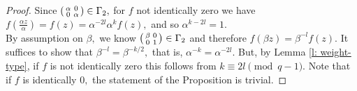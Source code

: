 \documentclass[11pt]{amsart}
\theoremstyle{definition}
\newenvironment{psmallmatrix}
{\left(\begin{smallmatrix}}
	{\end{smallmatrix}\right)}
\numberwithin{equation}{section}
\newcommand{\bbF}{\mathbb{F}}		%
\newcommand{\Mod}[1]{\ (\mathrm{mod}\ #1)}
\begin{document}
\begin{proof}
Since $\displaystyle{\begin{psmallmatrix}\alpha&0\\0&\alpha\end{psmallmatrix}\in \Gamma_2},$ for $f$ not identically zero we have $\displaystyle{f\left(\frac{\alpha z}{\alpha}\right) = f(z)=\alpha^{-2l}\alpha^k f(z)},$ and so 
$\alpha^{k-2l}=1.$\\

%

By assumption on $\beta,$ we know $\begin{psmallmatrix}\beta&0\\0&1\end{psmallmatrix}\in \Gamma_2$ and therefore $f(\beta z)=\beta^{-l}f(z).$ It suffices to show that $\beta^{-l}=\beta^{-k/2},$ that is, $\alpha^{-k}=\alpha^{-2l}.$ But, by Lemma \ref{l: weight-type}, if $f$ is not identically zero this follows from $k\equiv 2l\pmod{q-1}.$ Note that if $f$ is identically $0,$ the statement of the Proposition is trivial. 
\end{proof}
\end{document}
